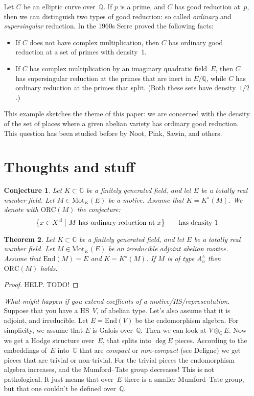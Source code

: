\documentclass{amsart}
\newtheorem{thm}{Theorem}[section]
\newtheorem{cnj}[thm]{Conjecture}
\begin{document}
Let $C$ be an elliptic curve over~$\mathbb{Q}$.
If $p$ is a prime, and $C$ has good reduction at~$p$,
then we can distinguish two types of good reduction:
so called \emph{ordinary} and \emph{supersingular} reduction.
In the 1960s %
Serre proved the following facts:
\begin{itemize}
 \item If $C$ does not have complex multiplication,
  then $C$ has ordinary good reduction at
  a set of primes with density~$1$.
 \item If $C$ has complex multiplication by an
  imaginary quadratic field~$E$,
  then $C$ has supersingular reduction
  at the primes that are inert in $E/\mathbb{Q}$,
  while $C$ has ordinary reduction at the primes that split.
  (Both these sets have density~$1/2$.)
\end{itemize}
This example sketches the theme of this paper:
we are concerned with the density of the set of places
where a given abelian variety has ordinary good reduction.
This question has been studied before by
Noot, Pink, Sawin, and others.

\section{Thoughts and stuff}

\begin{cnj}
 Let $K \subset \mathbb{C}$ be a finitely generated field,
 and let $E$ be a totally real number field.
 Let $M \in \mathrm{Mot}_K(E)$ be a motive.
 Assume that $K = K^\diamond(M)$.
 We denote with $\mathrm{ORC}(M)$ the conjecture:
 \[
  \bigl\{ x \in X^\mathrm{cl} \bigm|
  M~\text{has ordinary reduction at~$x$}\bigr\} \qquad\text{has density~$1$}
 \]
\end{cnj}

\begin{thm}
 Let $K \subset \mathbb{C}$ be a finitely generated field,
 and let $E$ be a totally real number field.
 Let $M \in \mathrm{Mot}_K(E)$ be an irreducible adjoint abelian motive.
 Assume that $\mathrm{End}(M) = E$ and $K = K^\diamond(M)$.
 If $M$ is of type $A_n^\wedge$ then $\mathrm{ORC}(M)$ holds.
\end{thm}
\begin{proof}
 HELP. TODO!
\end{proof}

\bigskip\noindent
\emph{What might happen if you extend coeffients of a motive/HS/representation.}\quad
Suppose that you have a HS~$V$, of abelian type.
Let's also assume that it is adjoint, and irreducible.
Let $E = \mathrm{End}(V)$ be the endomorphism algebra.
For simplicity, we assume that $E$ is Galois over~$\mathbb{Q}$.
Then we can look at $V \otimes_{\mathbb{Q}} E$.
Now we get a Hodge structure over~$E$, that splits into $\deg{E}$ pieces.
According to the embeddings of~$E$ into~$\mathbb{C}$
that are \emph{compact} or \emph{non-compact} (see Deligne)
we get pieces that are trivial or non-trivial.
For the trivial pieces the endomorphism algebra increases,
and the Mumford--Tate group decreases!
This is not pathological.
It just means that over~$E$ there is a smaller Mumford--Tate group,
but that one couldn't be defined over~$\mathbb{Q}$.

\printbibliography
\end{document}
